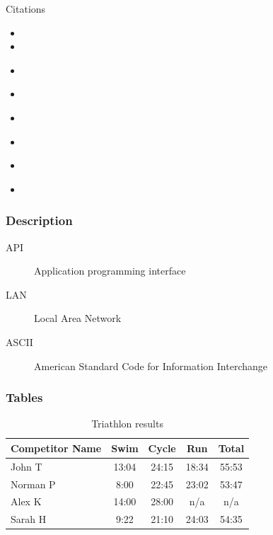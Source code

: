 \documentclass{beamer}
\begin{document}
\begin{frame}{Citations}
	
	\begin{itemize}
		\item {}
		
		\item {}
		
		\item \citep*{AkiyamaEtAl2020}
		
		\item \citet*{AkiyamaEtAl2020}
		
		\item \citealp*{BaranyEtAl2019}
		
		\item \citeauthor{BarralFeng2021}
		
		\item \citeauthor{BarreiraEtAl1999}
		
		\item \citeauthor{Erdoes1939}
	\end{itemize}

	
\end{frame}


\begin{frame}
	\frametitle{Description}
	\begin{description}
		\item[API] Application programming interface
		\item[LAN] Local Area Network
		\item[ASCII] American Standard Code for Information Interchange
	\end{description}
\end{frame}

\begin{frame}
	\frametitle{Tables}
	\begin{table}
		\centering
		\begin{tabular}{l | c | c | c | c }
			Competitor Name & Swim  & Cycle & Run   & Total \\
			\hline 
			John T          & 13:04 & 24:15 & 18:34 & 55:53 \\
			Norman P        & 8:00  & 22:45 & 23:02 & 53:47 \\
			Alex K          & 14:00 & 28:00 & n/a   & n/a   \\
			Sarah H         & 9:22  & 21:10 & 24:03 & 54:35
		\end{tabular}
		\caption{Triathlon results}
		\label{tab:1}
	\end{table}
	
\end{frame}
\end{document}
